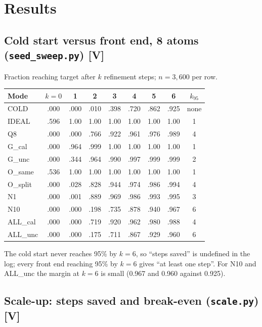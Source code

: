 \documentclass[11pt]{article}
\newcommand{\scr}[1]{\texttt{#1}}
\begin{document}
\section{Results}

\subsection{Cold start versus front end, 8 atoms (\scr{seed\_sweep.py}) [V]}\label{sec:cold}

Fraction reaching target after $k$ refinement steps; $n = 3{,}600$ per row.

\begin{center}
\begin{tabular}{lcccccccc}
\toprule
Mode & $k=0$ & 1 & 2 & 3 & 4 & 5 & 6 & $k_{95}$ \\
\midrule
COLD & .000 & .000 & .010 & .398 & .720 & .862 & .925 & none \\
IDEAL & .596 & 1.00 & 1.00 & 1.00 & 1.00 & 1.00 & 1.00 & 1 \\
Q8 & .000 & .000 & .766 & .922 & .961 & .976 & .989 & 4 \\
G\_cal & .000 & .964 & .999 & 1.00 & 1.00 & 1.00 & 1.00 & 1 \\
G\_unc & .000 & .344 & .964 & .990 & .997 & .999 & .999 & 2 \\
O\_same & .536 & 1.00 & 1.00 & 1.00 & 1.00 & 1.00 & 1.00 & 1 \\
O\_split & .000 & .028 & .828 & .944 & .974 & .986 & .994 & 4 \\
N1 & .000 & .001 & .889 & .969 & .986 & .993 & .995 & 3 \\
N10 & .000 & .000 & .198 & .735 & .878 & .940 & .967 & 6 \\
ALL\_cal & .000 & .000 & .719 & .920 & .962 & .980 & .988 & 4 \\
ALL\_unc & .000 & .000 & .175 & .711 & .867 & .929 & .960 & 6 \\
\bottomrule
\end{tabular}
\end{center}

The cold start never reaches 95\% by $k = 6$, so ``steps saved'' is undefined in the log; every front end reaching 95\% by $k = 6$ gives ``at least one step''. For N10 and ALL\_unc the margin at $k = 6$ is small (0.967 and 0.960 against 0.925).

\subsection{Scale-up: steps saved and break-even (\scr{scale.py}) [V]}\label{sec:scale}
\end{document}
